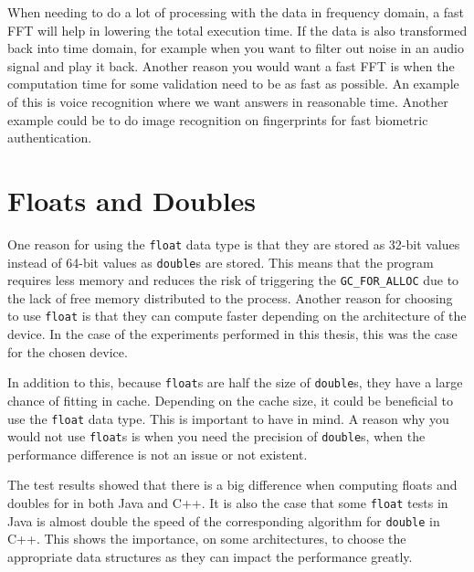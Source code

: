 When needing to do a lot of processing with the data in frequency domain, a fast FFT will help in lowering the total execution time. If the data is also transformed back into time domain, for example when you want to filter out noise in an audio signal and play it back. Another reason you would want a fast FFT is when the computation time for some validation need to be as fast as possible. An example of this is voice recognition where we want answers in reasonable time. Another example could be to do image recognition on fingerprints for fast biometric authentication.

\section{Floats and Doubles}


One reason for using the \texttt{float} data type is that they are stored as 32-bit values instead of 64-bit values as \texttt{double}s are stored. This means that the program requires less memory and reduces the risk of triggering the \texttt{GC\_FOR\_ALLOC} due to the lack of free memory distributed to the process. Another reason for choosing to use \texttt{float} is that they can compute faster depending on the architecture of the device. In the case of the experiments performed in this thesis, this was the case for the chosen device.

In addition to this, because \texttt{float}s are half the size of \texttt{double}s, they have a large chance of fitting in cache. Depending on the cache size, it could be beneficial to use the \texttt{float} data type. This is important to have in mind. A reason why you would not use \texttt{float}s is when you need the precision of \texttt{double}s, when the performance difference is not an issue or not existent.

The test results showed that there is a big difference when computing floats and doubles for in both Java and C++. It is also the case that some \texttt{float} tests in Java is almost double the speed of the corresponding algorithm for \texttt{double} in C++. This shows the importance, on some architectures, to choose the appropriate data structures as they can impact the performance greatly.

